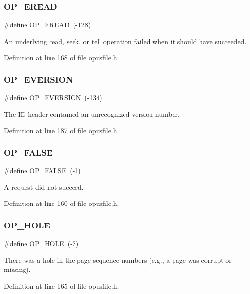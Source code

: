 \subsubsection{\texorpdfstring{OP\_EREAD}{OP\_EREAD}}
{\footnotesize\ttfamily \#define O\+P\+\_\+\+E\+R\+E\+AD~(-\/128)}

An underlying read, seek, or tell operation failed when it should have succeeded. 

Definition at line 168 of file opusfile.\+h.

\mbox{\label{group__error__codes_gaa9ae4494f623f3c0609f0b4bd99b8f32}} 
\subsubsection{\texorpdfstring{OP\_EVERSION}{OP\_EVERSION}}
{\footnotesize\ttfamily \#define O\+P\+\_\+\+E\+V\+E\+R\+S\+I\+ON~(-\/134)}

The ID header contained an unrecognized version number. 

Definition at line 187 of file opusfile.\+h.

\mbox{\label{group__error__codes_ga4fd28e64a5cbe5e0ba163916199611a5}} 
\subsubsection{\texorpdfstring{OP\_FALSE}{OP\_FALSE}}
{\footnotesize\ttfamily \#define O\+P\+\_\+\+F\+A\+L\+SE~(-\/1)}

A request did not succeed. 

Definition at line 160 of file opusfile.\+h.

\mbox{\label{group__error__codes_ga2ac03d35986d3505305d468dd2138b72}} 
\subsubsection{\texorpdfstring{OP\_HOLE}{OP\_HOLE}}
{\footnotesize\ttfamily \#define O\+P\+\_\+\+H\+O\+LE~(-\/3)}

There was a hole in the page sequence numbers (e.\+g., a page was corrupt or missing). 

Definition at line 165 of file opusfile.\+h.

